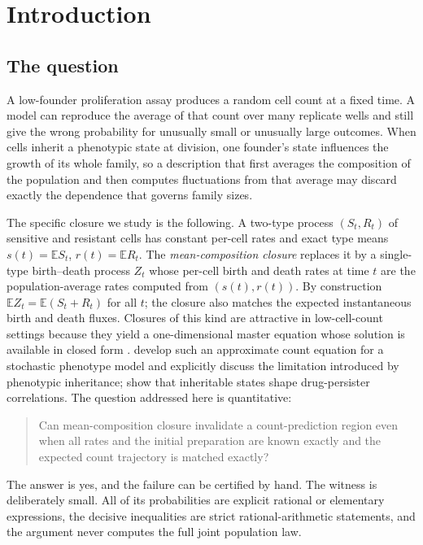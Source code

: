 \documentclass[11pt,a4paper]{article}
\theoremstyle{plain}
\theoremstyle{definition}
\theoremstyle{remark}
\newcommand{\EE}{\mathbb E}
\begin{document}
\section{Introduction}\label{sec:intro}

\subsection{The question}
A low-founder proliferation assay produces a random cell count at a fixed time. A model can reproduce the average of that count over many replicate wells and still give the wrong probability for unusually small or unusually large outcomes. When cells inherit a phenotypic state at division, one founder's state influences the growth of its whole family, so a description that first averages the composition of the population and then computes fluctuations from that average may discard exactly the dependence that governs family sizes.

The specific closure we study is the following. A two-type process $(S_t,R_t)$ of sensitive and resistant cells has constant per-cell rates and exact type means $s(t)=\EE S_t$, $r(t)=\EE R_t$. The \emph{mean-composition closure} replaces it by a single-type birth--death process $Z_t$ whose per-cell birth and death rates at time $t$ are the population-average rates computed from $(s(t),r(t))$. By construction $\EE Z_t=\EE(S_t+R_t)$ for all $t$; the closure also matches the expected instantaneous birth and death fluxes. Closures of this kind are attractive in low-cell-count settings because they yield a one-dimensional master equation whose solution is available in closed form \citep{kendall1948,bailey1964}. \citet{browning2025} develop such an approximate count equation for a stochastic phenotype model and explicitly discuss the limitation introduced by phenotypic inheritance; \citet{iyer2025} show that inheritable states shape drug-persister correlations. The question addressed here is quantitative:

\begin{quote}
Can mean-composition closure invalidate a count-prediction region even when all rates and the initial preparation are known exactly and the expected count trajectory is matched exactly?
\end{quote}

The answer is yes, and the failure can be certified by hand. The witness is deliberately small. All of its probabilities are explicit rational or elementary expressions, the decisive inequalities are strict rational-arithmetic statements, and the argument never computes the full joint population law.
\end{document}
